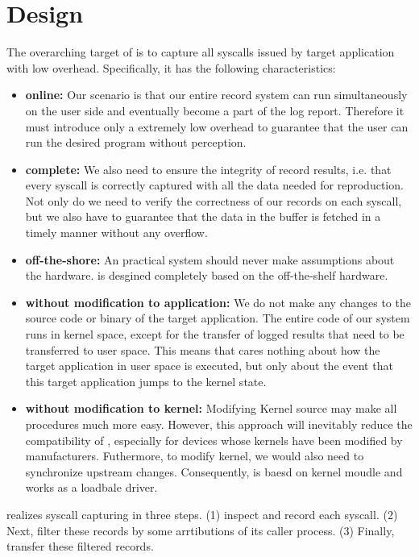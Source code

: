 \section{Design}
The overarching target of \TheName is to capture all syscalls issued by target application with low overhead. Specifically, it has the following characteristics:

\begin{itemize}
    \item \textbf{online:} Our scenario is that our entire record system can  run simultaneously on the user side and eventually become a part of the log report. Therefore it must introduce only a extremely low overhead to guarantee that the user can run the desired program without perception.
    \item \textbf{complete:} We also need to ensure the integrity of record results, i.e. that every syscall is correctly captured with all the data needed for reproduction. Not only do we need to verify the correctness of our records on each syscall, but we also have to guarantee that the data in the buffer is fetched in a timely manner without any overflow.
    \item \textbf{off-the-shore:} An practical system should never make assumptions about the hardware. \TheName is desgined completely based on the off-the-shelf hardware.
    \item \textbf{without modification to application:} We do not make any changes to the source code or binary of the target application. The entire code of our system runs in kernel space, except for the transfer of logged results that need to be transferred to user space. This means that \TheName cares nothing about how the target application in user space is executed, but only about the event that this target application jumps to the kernel state.
    \item \textbf{without modification to kernel:} Modifying Kernel source may make all procedures much more easy. However, this approach will inevitably reduce the compatibility of \TheName, especially for devices whose kernels have been modified by manufacturers. Futhermore, to modify kernel, we would also need to synchronize upstream changes. Consequently, \TheName is baesd on kernel moudle and works as a loadbale driver.
\end{itemize}


\TheName realizes syscall capturing in three steps. (1) \TheName inspect and record each syscall. (2) Next, \TheName filter these records by some arrtibutions of its caller process. (3) Finally, \TheName transfer these filtered records.

